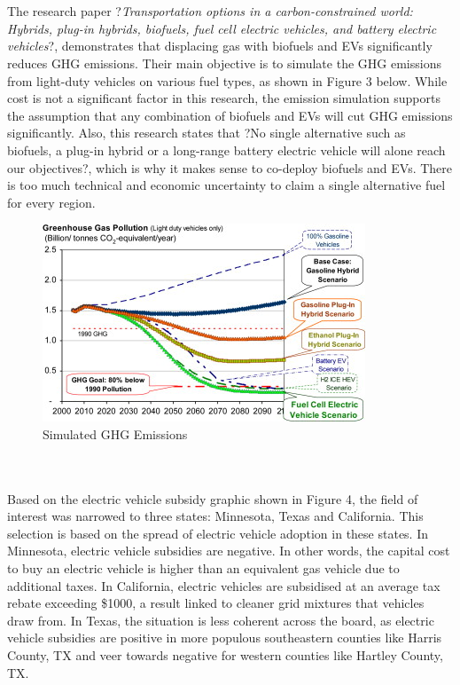 \documentclass[answers]{exam}
\begin{document}
\\ ~\\
The research paper ?\textit{Transportation options in a carbon-constrained world: Hybrids, plug-in hybrids, biofuels, fuel cell electric vehicles, and battery electric vehicles}?\cite{Sandy}, demonstrates that displacing gas with biofuels and EVs significantly reduces GHG emissions. Their main objective is to simulate the GHG emissions from light-duty vehicles on various fuel types, as shown in Figure 3 below. While cost is not a significant factor in this research, the emission simulation supports the assumption that any combination of biofuels and EVs will cut GHG emissions significantly. Also, this research states that ?No single alternative such as biofuels, a plug-in hybrid or a long-range battery electric vehicle will alone reach our objectives?,  which is why it makes sense to co-deploy biofuels and EVs. There is too much technical and economic uncertainty to claim a single alternative fuel for every region. 

\begin{figure}[h]
    \centering
    \includegraphics[scale=1]{figure3.jpg}
    \caption{Simulated GHG Emissions}
    \label{fig:my_label}
\end{figure}
\\~\\
Based on the electric vehicle subsidy graphic shown in Figure 4\cite{Jaffe}, the field of interest was narrowed to three states: Minnesota, Texas and California. This selection is based on the spread of electric vehicle adoption in these states. In Minnesota, electric vehicle subsidies are negative. In other words, the capital cost to buy an electric vehicle is higher than an equivalent gas vehicle due to additional taxes. In California, electric vehicles are subsidised at an average tax rebate exceeding \$1000, a result linked to cleaner grid mixtures that vehicles draw from. In Texas, the situation is less coherent across the board, as electric vehicle subsidies are positive in more populous southeastern counties like Harris County, TX and veer towards negative for western counties like Hartley County, TX. 
\end{document}
